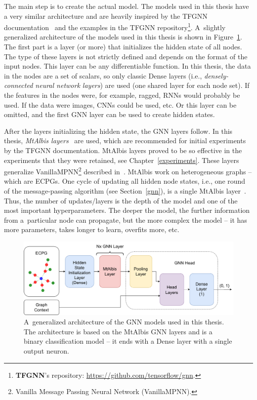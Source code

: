 The main step is to create the actual model. The models used in this thesis have a very similar architecture and are heavily inspired by the TFGNN documentation~\cite{tfgnn-runner, tfgnn-gnn-modeling, tfgnn-mtalbis} and the examples in the TFGNN repository\footnote{\textbf{TFGNN}'s repository: \url{https://github.com/tensorflow/gnn}.}. A~slightly generalized architecture of the models used in this thesis is shown in Figure~\ref{figure:model-architecture}. The first part is a layer (or more) that initializes the hidden state of all nodes. The type of these layers is not strictly defined and depends on the format of the input nodes. This layer can be any differentiable function. In this thesis, the data in the nodes are a set of scalars, so only classic Dense layers (i.e., \textit{densely-connected neural network layers}) are used (one shared layer for each node set). If the features in the nodes were, for example, ragged, RNNs would probably be used. If the data were images, CNNs could be used, etc. Or this layer can be omitted, and the first GNN layer can be used to create hidden states.

After the layers initializing the hidden state, the GNN layers follow. In this thesis, \textit{MtAlbis layers}~\cite{tfgnn-mtalbis, tfgnn-gnn-models} are used, which are recommended for initial experiments by the TFGNN documentation. MtAlbis layers proved to be so effective in the experiments that they were retained, see Chapter~\ref{experiments}. These layers generalize VanillaMPNN\footnote{Vanilla Message Passing Neural Network (VanillaMPNN).} described in~\cite{ferludin2022tf}. MtAlbis work on heterogeneous graphs -- which are ECPGs. One cycle of updating all hidden node states, i.e., one round of the message-passing algorithm (see Section~\ref{gnn}), is a single MtAlbis layer~\cite{tfgnn-mtalbis}. Thus, the number of updates/layers is the depth of the model and one of the most important hyperparameters. The deeper the model, the further information from a~particular node can propagate, but the more complex the model -- it has more parameters, takes longer to learn, overfits more, etc.

\begin{figure}[t]
	\centering
	\includegraphics[width=1\textwidth]{figures/model-architecture.pdf}
	\caption{A~generalized architecture of the GNN models used in this thesis. The architecture is based on the MtAlbis GNN layers and is a binary classification model -- it ends with a Dense layer with a single output neuron.}
	\label{figure:model-architecture}
\end{figure}


